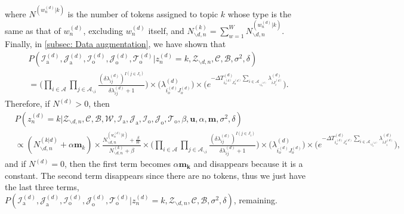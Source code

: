 \documentclass[a4paper]{article}
\begin{document}
 where $N^{(w_n^{(d)}|k)}$ is the number of tokens assigned to topic $k$ whose type is the same as that of $w_n^{(d)}$, excluding $w_n^{(d)}$ itself, and $N^{(k)}_{\backslash d, n}=\sum_{w=1}^W N_{\backslash d, n}^{(w_n^{(d)}|k)}$. Finally, in \ref{subsec: Data augmentation}, we have shown that
 \begin{equation}
 \begin{aligned}
& P(\mathcal{I}^{(d)}_{\mbox{a}}, \mathcal{J}^{(d)}_{\mbox{a}}, \mathcal{I}^{(d)}_{\mbox{o}}, \mathcal{J}^{(d)}_{\mbox{o}}, \mathcal{T}^{(d)}_{\mbox{o}}| z^{(d)}_n=k, \mathcal{Z}_{\backslash d, n}, \mathcal{C}, \mathcal{B}, \sigma^2, \delta)\\&=\Big(\prod_{i\in \mathcal{A}}\prod_{j \in \mathcal{A}_{\backslash i }} \frac{(\delta\lambda^{(d)}_{ij})^{I(j \in J_i)}}{\delta\lambda^{(d)}_{ij}+1}\Big)\times \Big(\lambda^{(d)}_{i_o^{(d)}J_{o}^{(d)}}\Big)\times  \Big(e^{-\Delta T^{(d)}_{i_o^{(d)}J_o^{(d)}}\sum\limits_{i\in \mathcal{A}_{\backslash i_o^{(d)}}}\lambda^{(d)}_{iJ^{(d)}_{i}}}\Big).
 \end{aligned}
 \end{equation}
 Therefore, if $N^{(d)} > 0$, then
 \begin{equation}
 \begin{aligned}
  &P(z^{(d)}_n=k|\mathcal{Z}_{\backslash d, n},   \mathcal{C},   \mathcal{B},\mathcal{W}, \mathcal{I}_{\mbox{a}}, \mathcal{J}_{\mbox{a}}, \mathcal{I}_{\mbox{o}}, \mathcal{J}_{\mbox{o}}, \mathcal{T}_{\mbox{o}}, \beta, \boldsymbol{u}, \alpha, \boldsymbol{m}, \sigma^2, \delta)\\&\propto (N^{(k|d)}_{\backslash d, n}+\alpha \boldsymbol{m}_k)\times \frac{N^{(w_n^{(d)}|k)}_{\backslash d, n}+\frac{\beta}{W} }{N^{(k)}_{\backslash d, n}+\beta}\times\Big(\prod_{i\in \mathcal{A}}\prod_{j \in \mathcal{A}_{\backslash i }} \frac{(\delta\lambda^{(d)}_{ij})^{I(j \in J_i)}}{\delta\lambda^{(d)}_{ij}+1}\Big)\times \Big(\lambda^{(d)}_{i_o^{(d)}J_{o}^{(d)}}\Big)\times  \Big(e^{-\Delta T^{(d)}_{i_o^{(d)}J_o^{(d)}}\sum\limits_{i\in \mathcal{A}_{\backslash i_o^{(d)}}}\lambda^{(d)}_{iJ^{(d)}_{i}}}\Big), 
 \end{aligned}
 \end{equation}
 and if $N^{(d)} = 0$, then the first term becomes $\alpha\boldsymbol{m_k}$ and disappears because it is a constant. The second term disappears since there are no tokens, thus we just have the last three terms, $P(\mathcal{I}^{(d)}_{\mbox{a}}, \mathcal{J}^{(d)}_{\mbox{a}},  \mathcal{I}^{(d)}_{\mbox{o}}, \mathcal{J}^{(d)}_{\mbox{o}}, \mathcal{T}^{(d)}_{\mbox{o}}| z^{(d)}_n=k, \mathcal{Z}_{\backslash d, n}, \mathcal{C}, \mathcal{B}, \sigma^2, \delta)$, remaining.
\end{document}
